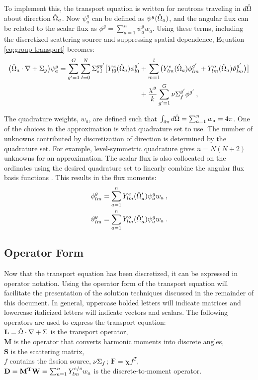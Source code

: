 To implement this, the transport equation is written for neutrons traveling in $d\hat{\Omega}$ about direction $\hat{\Omega}_{a}$. Now $\psi^{g}_{a}$ can be defined as $\psi^{g}(\hat{\Omega}_{a})$, and the angular flux can be related to the scalar flux as $\phi^{g} = \sum_{a=1}^{n}\psi^{g}_{a}w_{a}$. Using these terms, including the discretized scattering source and suppressing spatial dependence, Equation \eqref{eq:group-transport} becomes:
%
\begin{align}
 \bigl( \hat{\Omega}_{a} \cdot \nabla + \Sigma_{g} \bigr) \psi^g_{a} = \sum_{g' = 1}^{G} \sum_{l=0}^{N} \Sigma^{gg'}_{s\,l} \bigl[ Y^{e}_{l0}(\hat{\Omega}_{a}) \phi^{g'}_{l0} &+ \sum_{m=1}^{l} \bigl( Y^{e}_{lm}(\hat{\Omega}_{a}) \phi^{g'}_{lm} + Y^{o}_{lm}(\hat{\Omega}_{a}) \vartheta^{g'}_{lm} \bigr) \bigr] \nonumber \\
 &+ \frac{\chi^{g}}{k} \sum_{g'=1}^{G} \nu \Sigma_{f}^{g'}\phi^{g'} \:,
  \label{eq:mg-sn-transport}
\end{align}

The quadrature weights, $w_{a}$, are defined such that $\int_{4 \pi} d\hat{\Omega} =  \sum_{a=1}^{n}w_{a} = 4 \pi$. One of the choices in the \Sn approximation is what quadrature set to use. The number of unknowns contributed by discretization of direction is determined by the quadrature set. For example, level-symmetric quadrature gives $n = N(N+2)$ unknowns for an \Sn approximation. The scalar flux is also collocated on the ordinates using the desired quadrature set to linearly combine the angular flux basis functions \cite{Evans2009}. This results in the flux moments:
%
\begin{align}
  \phi^g_{lm} &= \sum_{a=1}^{n}Y^e_{lm}(\hat{\Omega}'_a)\psi^g_a w_a\:,
  \label{eq:even-flux-quad-int}\\
  \vartheta^g_{lm} &= \sum_{a=1}^{n}Y^o_{lm}(\hat{\Omega}'_a)\psi^g_a w_a\:.
  \label{eq:odd-flux-quad-int}
\end{align}

\subsection{Operator Form}
Now that the transport equation has been discretized, it can be expressed in operator notation. Using the operator form of the transport equation will facilitate the presentation of the solution techniques discussed in the remainder of this document. In general, uppercase bolded letters will indicate matrices and lowercase italicized letters will indicate vectors and scalars. The following operators are used to express the transport equation:\\
%
\indent $\mathbf{L} = \hat{\Omega} \cdot \nabla + \Sigma$ is the transport operator, \\
\indent $\mathbf{M}$ is the operator that converts harmonic moments into discrete angles, \\
\indent $\mathbf{S}$ is the scattering matrix, \\
\indent $f$ contains the fission source, $\nu \Sigma_{f}$; $\mathbf{F} =\mathbf{\chi} f^{T}$, \\ 
\indent $\mathbf{D} = \mathbf{M^{T}}\mathbf{W} = \sum_{a=1}^{n}Y^{e/o}_{lm}w_{a}$ is the discrete-to-moment operator. 

